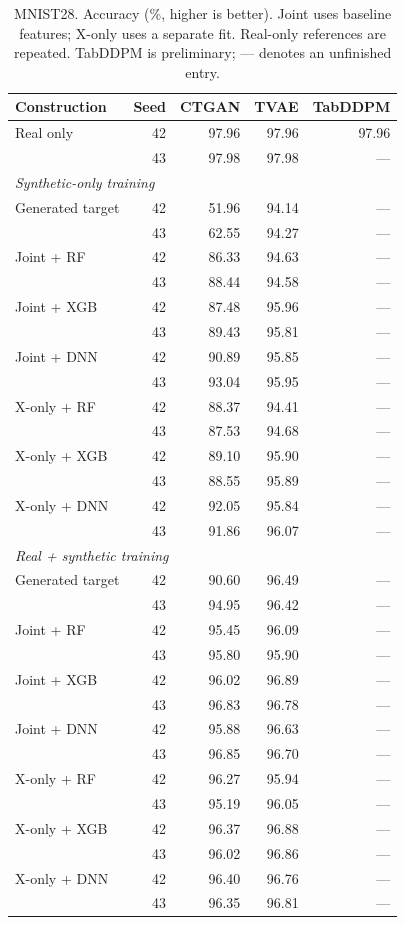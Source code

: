 \begin{table}[ht]
\centering
{\small
\setlength{\tabcolsep}{2pt}
\begin{tabular}{lrrrr}
\toprule
Construction & Seed & CTGAN & TVAE & TabDDPM \\
\midrule
Real only & 42 & 97.96 & 97.96 & 97.96 \\
 & 43 & 97.98 & 97.98 & --- \\
\midrule
\multicolumn{5}{l}{\textit{Synthetic-only training}} \\
Generated target & 42 & 51.96 & 94.14 & --- \\
 & 43 & 62.55 & 94.27 & --- \\
Joint + RF & 42 & 86.33 & 94.63 & --- \\
 & 43 & 88.44 & 94.58 & --- \\
Joint + XGB & 42 & 87.48 & 95.96 & --- \\
 & 43 & 89.43 & 95.81 & --- \\
Joint + DNN & 42 & 90.89 & 95.85 & --- \\
 & 43 & 93.04 & 95.95 & --- \\
X-only + RF & 42 & 88.37 & 94.41 & --- \\
 & 43 & 87.53 & 94.68 & --- \\
X-only + XGB & 42 & 89.10 & 95.90 & --- \\
 & 43 & 88.55 & 95.89 & --- \\
X-only + DNN & 42 & 92.05 & 95.84 & --- \\
 & 43 & 91.86 & 96.07 & --- \\
\midrule
\multicolumn{5}{l}{\textit{Real + synthetic training}} \\
Generated target & 42 & 90.60 & 96.49 & --- \\
 & 43 & 94.95 & 96.42 & --- \\
Joint + RF & 42 & 95.45 & 96.09 & --- \\
 & 43 & 95.80 & 95.90 & --- \\
Joint + XGB & 42 & 96.02 & 96.89 & --- \\
 & 43 & 96.83 & 96.78 & --- \\
Joint + DNN & 42 & 95.88 & 96.63 & --- \\
 & 43 & 96.85 & 96.70 & --- \\
X-only + RF & 42 & 96.27 & 95.94 & --- \\
 & 43 & 95.19 & 96.05 & --- \\
X-only + XGB & 42 & 96.37 & 96.88 & --- \\
 & 43 & 96.02 & 96.86 & --- \\
X-only + DNN & 42 & 96.40 & 96.76 & --- \\
 & 43 & 96.35 & 96.81 & --- \\
\bottomrule
\end{tabular}
}
\caption{MNIST28. Accuracy (\%, higher is better). Joint uses baseline features; X-only uses a separate fit. Real-only references are repeated. TabDDPM is preliminary; --- denotes an unfinished entry.}
\label{tab:mnist28}
\end{table}
